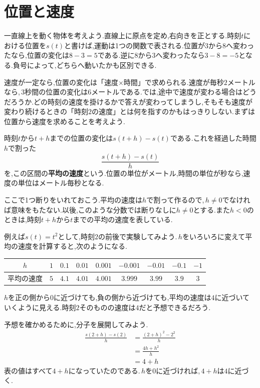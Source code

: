 \section{位置と速度}\label{節:位置と速度}
一直線上を動く物体を考えよう.直線上に原点を定め,右向きを正とする.時刻$t$における位置を$s(t)$と書けば,運動は1つの関数で表される.位置が$3$から$8$へ変わったなら,位置の変化は$8-3=5$である.逆に$8$から$3$へ変わったなら$3-8=-5$となる.負号によって,どちらへ動いたかも区別できる.

速度が一定なら,位置の変化は「速度$\times$時間」で求められる.速度が毎秒$2$メートルなら,\,$3$秒間の位置の変化は$6$メートルである.では,途中で速度が変わる場合はどうだろうか.どの時刻の速度を掛けるかで答えが変わってしまうし,そもそも速度が変わり続けるときの「時刻$2$の速度」とは何を指すのかもはっきりしない.まずは位置から速度を求めることを考えよう.

時刻$t$から$t+h$までの位置の変化は$s(t+h)-s(t)$である.これを経過した時間$h$で割った
\[
 \frac{s(t+h)-s(t)}h
\]
を,この区間の\textbf{平均の速度}という.位置の単位がメートル,時間の単位が秒なら,速度の単位はメートル毎秒となる.

ここで1つ断りをいれておこう.平均の速度は$h$で割って作るので,\,$h\ne0$でなければ意味をもたない.以後,このような分数では断りなしに$h\ne0$とする.また$h<0$のときは,時刻$t+h$から$t$までの平均の速度を表している.

例えば$s(t)=t^2$として,時刻$2$の前後で実験してみよう.\,$h$をいろいろに変えて平均の速度を計算すると,次のようになる.
\begin{center}
\begin{tabular}{ccccccccc}
\toprule
$h$ & $1$ & $0.1$ & $0.01$ & $0.001$ & $-0.001$ & $-0.01$ & $-0.1$ & $-1$\\
\midrule
平均の速度 & $5$ & $4.1$ & $4.01$ & $4.001$ & $3.999$ & $3.99$ & $3.9$ & $3$\\
\bottomrule
\end{tabular}
\end{center}
$h$を正の側から$0$に近づけても,負の側から近づけても,平均の速度は$4$に近づいていくように見える.時刻$2$そのものの速度は$4$だと予想できるだろう.

予想を確かめるために,分子を展開してみよう.
\begin{align*}
 \frac{s(2+h)-s(2)}h
 &=\frac{(2+h)^2-2^2}h\\
 &=\frac{4h+h^2}h\\
 &=4+h
\end{align*}
表の値はすべて$4+h$になっていたのである.\,$h$を$0$に近づければ,\,$4+h$は$4$に近づく.


